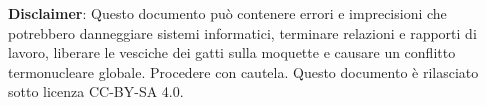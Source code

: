 \documentclass[answers, a4paper, 11pt]{exam}
\begin{document}
\textbf{Disclaimer}:  Questo documento può contenere errori e imprecisioni che potrebbero danneggiare sistemi informatici, terminare relazioni e rapporti di lavoro, liberare le vesciche dei gatti sulla moquette e causare un conflitto termonucleare globale.
Procedere con cautela.
Questo documento è rilasciato sotto licenza CC-BY-SA 4.0. \ccbysa
\end{document}
